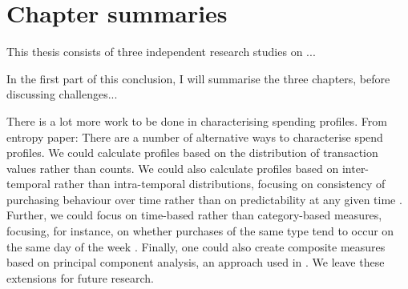 
\section{Chapter summaries}%
\label{sec:chapter_summaries}

This thesis consists of three independent research studies on ...

In the first part of this conclusion, I will summarise the three chapters,
before discussing challenges...


There is a lot more work to be done in characterising spending profiles. From
entropy paper: There are a number of alternative ways to characterise spend
profiles. We could calculate profiles based on the distribution of transaction
values rather than counts. We could also calculate profiles based on
inter-temporal rather than intra-temporal distributions, focusing on
consistency of purchasing behaviour over time rather than on predictability at
any given time \citep{krumme2013predictability}. Further, we could focus on
time-based rather than category-based measures, focusing, for instance, on
whether purchases of the same type tend to occur on the same day of the week
\citep{guidotti2015behavioral}. Finally, one could also create composite
measures based on principal component analysis, an approach used in
\citet{eagle2010network}. We leave these extensions for future research.

